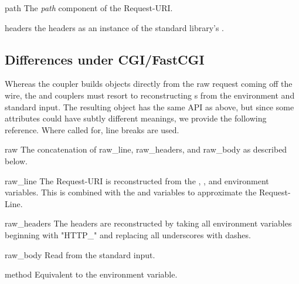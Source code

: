 \begin{datadesc}{path}
The \emph{path} component of the Request-URI.
\end{datadesc}

\begin{datadesc}{headers}
the headers as an instance of the standard library's
.
\end{datadesc}


\subsection{Differences under CGI/FastCGI}

Whereas the  coupler builds  objects directly
from the raw request coming off the wire, the  and 
couplers must resort to reconstructing s from the environment and
standard input. The resulting object has the same API as above, but since some
attributes could have subtly different meanings, we provide the following
reference. Where called for,  line breaks are used.

\begin{datadesc}{raw}
The concatenation of raw_line, raw_headers, and raw_body as described below.
\end{datadesc}

\begin{datadesc}{raw_line}
The Request-URI is reconstructed from the ,
, and  environment variables. This is
combined with the  and  variables
to approximate the Request-Line.
\end{datadesc}

\begin{datadesc}{raw_headers}
The headers are reconstructed by taking all environment variables beginning with
"HTTP_" and replacing all underscores with dashes.
\end{datadesc}

\begin{datadesc}{raw_body}
Read from the standard input.
\end{datadesc}

\begin{datadesc}{method}
Equivalent to the  environment variable.
\end{datadesc}

